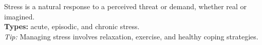 Stress is a natural response to a perceived threat or demand, whether real or imagined.\\
\textbf{Types:} acute, episodic, and chronic stress.\\
\textit{Tip:} Managing stress involves relaxation, exercise, and healthy coping strategies.\\ 